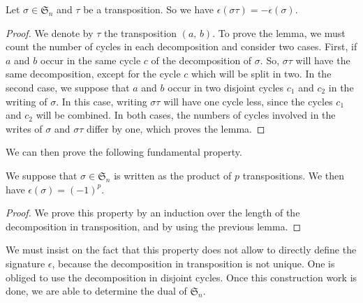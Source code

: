 \begin{lem}
Let $\sigma \in \mathfrak{S}_n $ and $\tau $ be a transposition. So we have $\epsilon(\sigma \tau) = - \epsilon(\sigma)$.
\end{lem}
\begin{proof}
We denote by $\tau $ the transposition $ (a, \, b)$. To prove the lemma, we must count the number of cycles in each decomposition and consider two cases. First, if $ a $ and $ b $ occur in the same cycle $ c $ of the decomposition of $\sigma $. So, $\sigma \tau $ will have the same decomposition, except for the cycle $ c $ which will be split in two. In the second case, we suppose that $ a $ and $ b $ occur in two disjoint cycles $ c_1$ and $ c_2 $ in the writing of $\sigma $. In this case, writing $\sigma \tau $ will have one cycle less, since the cycles $ c_1$ and $ c_2 $ will be combined. In both cases, the numbers of cycles involved in the writes of $\sigma $ and $\sigma \tau $ differ by one, which proves the lemma.
\end{proof}
We can then prove the following fundamental property.

\begin{prop}
We suppose that $\sigma \in \mathfrak{S}_n $ is written as the product of $ p $ transpositions. We then have $\epsilon(\sigma) = (-1)^p $.
\end{prop}
\begin{proof}
We prove this property by an induction over the length of the decomposition in transposition, and by using the previous lemma.
\end{proof}
We must insist on the fact that this property does not allow to directly define the signature $\epsilon $, because the decomposition in transposition is not unique. One is obliged to use the decomposition in disjoint cycles. Once this construction work is done, we are able to determine the dual of $\mathfrak{S}_n $.


